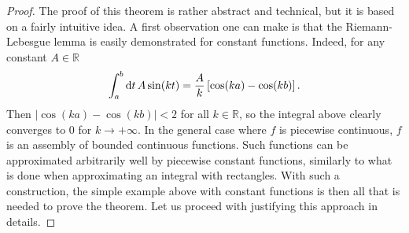 \begin{proof}
  The proof of this theorem is rather abstract and technical, but it is based on a fairly
  intuitive idea. A first observation one can make is that the Riemann-Lebesgue lemma is
  easily demonstrated for constant functions. Indeed, for any constant $A\in\mathbb{R}$
  \begin{equation}
    \int_a^b\mathrm{d} t\,A\sin(kt)=\frac{A}{k}\,[\cos(ka)-\cos(kb)]\,.
    \label{eq:rl-const}
  \end{equation}
  Then $|\cos(ka)-\cos(kb)|<2$ for all $k\in\mathbb{R}$, so the integral above clearly
  converges to $0$ for $k\to+\infty$. In the general case where $f$ is piecewise
  continuous, $f$ is an assembly of bounded continuous functions. Such functions can be
  approximated arbitrarily well by piecewise constant functions, similarly to what is done
  when approximating an integral with rectangles. With such a construction, the simple
  example above with constant functions is then all that is needed to prove the theorem.
  Let us proceed with justifying this approach in details.


\end{proof}
